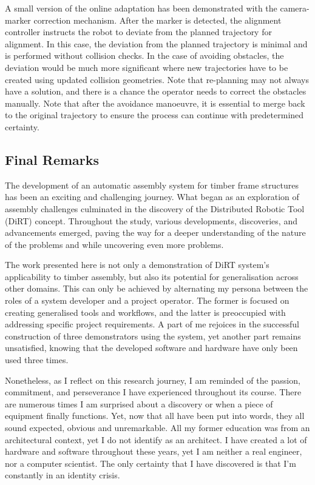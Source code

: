 \documentclass[11pt]{book}
\begin{document}
A small version of the online adaptation has been demonstrated with the camera-marker correction mechanism. After the marker is detected, the alignment controller instructs the robot to deviate from the planned trajectory for alignment. In this case, the deviation from the planned trajectory is minimal and is performed without collision checks. In the case of avoiding obstacles, the deviation would be much more significant where new trajectories have to be created using updated collision geometries. Note that re-planning may not always have a solution, and there is a chance the operator needs to correct the obstacles manually. Note that after the avoidance manoeuvre, it is essential to merge back to the original trajectory to ensure the process can continue with predetermined certainty.

\subsection{Final Remarks}

The development of an automatic assembly system for timber frame structures has been an exciting and challenging journey. What began as an exploration of assembly challenges culminated in the discovery of the Distributed Robotic Tool (DiRT) concept. Throughout the study, various developments, discoveries, and advancements emerged, paving the way for a deeper understanding of the nature of the problems and while uncovering even more problems.

The work presented here is not only a demonstration of DiRT system's applicability to timber assembly, but also its potential for generalisation across other domains. This can only be achieved by alternating my persona between the roles of a system developer and a project operator. The former is focused on creating generalised tools and workflows, and the latter is preoccupied with addressing specific project requirements. A part of me rejoices in the successful construction of three demonstrators using the system, yet another part remains unsatisfied, knowing that the developed software and hardware have only been used three times.

Nonetheless, as I reflect on this research journey, I am reminded of the passion, commitment, and perseverance I have experienced throughout its course. There are numerous times I am surprised about a discovery or when a piece of equipment finally functions. Yet, now that all have been put into words, they all sound expected, obvious and unremarkable. All my former education was from an architectural context, yet I do not identify as an architect. I have created a lot of hardware and software throughout these years, yet I am neither a real engineer, nor a computer scientist. The only certainty that I have discovered is that I’m constantly in an identity crisis. 
\end{document}
